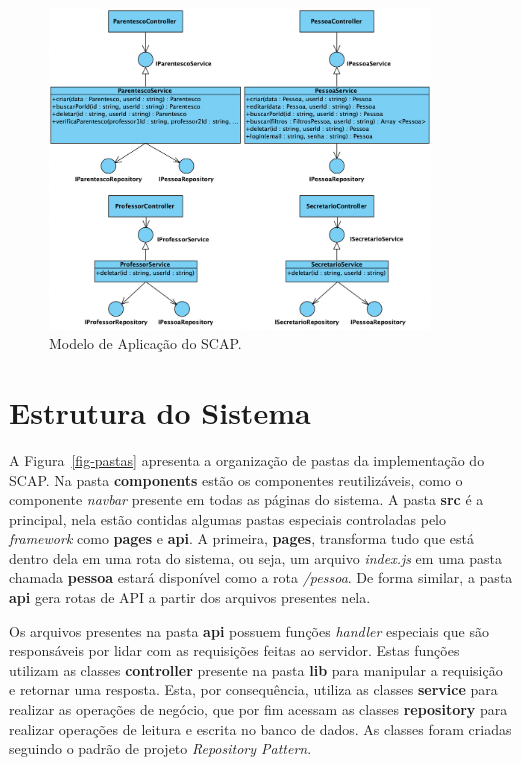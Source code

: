\begin{figure}[h!]
    \centering
    \includegraphics[width=0.9\textwidth]{figuras/fig-modelo-apl-2.png}
    \caption{Modelo de Aplicação do SCAP.}
    \label{fig-modelo-aplicacao-2}
\end{figure}


\section{Estrutura do Sistema}
\label{sec-projeto-estrutura}

A Figura~\ref{fig-pastas} apresenta a organização de pastas da implementação do SCAP. 
Na pasta \textbf{components} estão os componentes reutilizáveis, como o componente \textit{navbar} presente em todas as páginas do sistema.
A pasta \textbf{src} é a principal, nela estão contidas algumas pastas especiais controladas pelo \textit{framework}
como \textbf{pages} e \textbf{api}. A primeira, \textbf{pages}, transforma tudo que está dentro dela em uma rota do sistema,
ou seja, um arquivo \textit{index.js} em uma pasta chamada \textbf{pessoa} estará disponível como a rota \textit{/pessoa}.
De forma similar, a pasta \textbf{api} gera rotas de API a partir dos arquivos presentes nela.

Os arquivos presentes na pasta \textbf{api} possuem funções \textit{handler} especiais que são responsáveis por lidar com as requisições feitas ao servidor.
Estas funções utilizam as classes \textbf{controller} presente na pasta \textbf{lib} para manipular a requisição e retornar uma resposta.
Esta, por consequência, utiliza as classes \textbf{service} para realizar as operações de negócio, que por fim acessam as classes \textbf{repository} para realizar
operações de leitura e escrita no banco de dados. As classes foram criadas seguindo o padrão de projeto \textit{Repository Pattern}.


